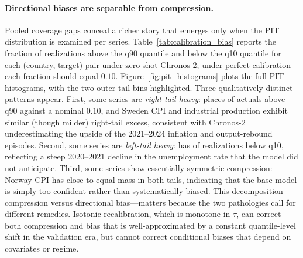 \documentclass[12pt,a4paper]{article}
\begin{document}
\begin{table}[H]
\centering \small
\caption{Empirical coverage of nominal $80\%$ (q10--q90) and $50\%$ (q25--q75) predictive bands. FT: fine-tuned agent-selected Chronos-2. ZS: zero-shot Chronos-2. Cal: per-series isotonic recalibration of the fine-tuned output using validation-era PIT. Pooled rows average across country--target--horizon--origin.}
\label{tab:calibration}

\end{table}

\paragraph{Directional biases are separable from compression.}
Pooled coverage gaps conceal a richer story that emerges only when the PIT distribution is examined per series. Table~\ref{tab:calibration_bias} reports the fraction of realizations above the q90 quantile and below the q10 quantile for each (country, target) pair under zero-shot Chronos-2; under perfect calibration each fraction should equal $0.10$. Figure~\ref{fig:pit_histograms} plots the full PIT histograms, with the two outer tail bins highlighted. Three qualitatively distinct patterns appear. First, some series are \emph{right-tail heavy}: \worstRightCountry{} \worstRightTarget{} places \worstRightFrac{} of actuals above q90 against a nominal $0.10$, and Sweden CPI and industrial production exhibit similar (though milder) right-tail excess, consistent with Chronos-2 underestimating the upside of the 2021--2024 inflation and output-rebound episodes. Second, some series are \emph{left-tail heavy}: \worstLeftCountry{} \worstLeftTarget{} has \worstLeftFrac{} of realizations below q10, reflecting a steep 2020--2021 decline in the unemployment rate that the model did not anticipate. Third, some series show essentially symmetric compression: Norway CPI has close to equal mass in both tails, indicating that the base model is simply too confident rather than systematically biased. This decomposition---compression versus directional bias---matters because the two pathologies call for different remedies. Isotonic recalibration, which is monotone in $\tau$, can correct both compression and bias that is well-approximated by a constant quantile-level shift in the validation era, but cannot correct conditional biases that depend on covariates or regime.

\begin{table}[H]
\centering \small
\caption{PIT tail fractions under zero-shot Chronos-2. Each cell is the share of test-era realizations above q90 or below q10 within a given (country, target) pair, pooled across horizons and origins. Under calibration both columns should equal $0.10$.}
\label{tab:calibration_bias}

\end{table}
\end{document}
